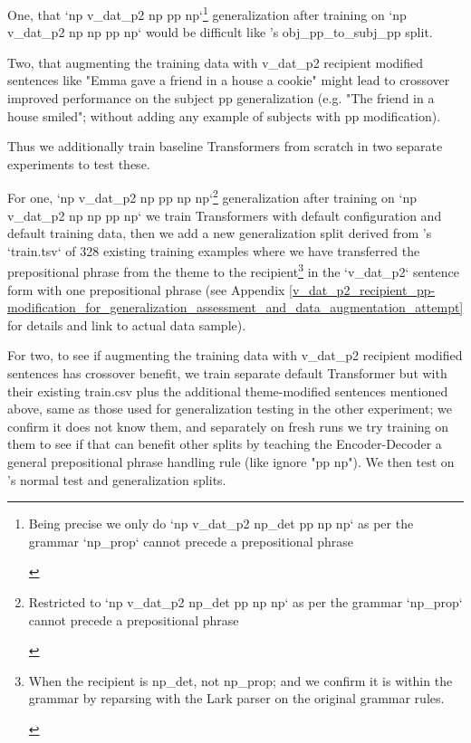 \documentclass[11pt]{article}
\begin{document}
One, that `np v\_dat\_p2 np pp np`\footnote{\begin{footnotesize}Being precise we only do `np v\_dat\_p2 np\_det pp np np` as per the grammar `np\_prop` cannot precede a prepositional phrase\end{footnotesize}} generalization after training on `np v\_dat\_p2 np np pp np` would be difficult like \citep{Wu2023}'s obj\_pp\_to\_subj\_pp split.

Two, that augmenting the training data with v\_dat\_p2 recipient modified sentences like "Emma gave a friend in a house a cookie" might lead to crossover improved performance on the subject pp generalization (e.g. "The friend in a house smiled"; without adding any example of subjects with pp modification).

Thus we additionally train \citep{Wu2023} baseline Transformers from scratch in two separate experiments to test these.

For one, `np v\_dat\_p2 np pp np np`\footnote{\begin{footnotesize}Restricted to `np v\_dat\_p2 np\_det pp np np` as per the grammar `np\_prop` cannot precede a prepositional phrase\end{footnotesize}} generalization after training on `np v\_dat\_p2 np np pp np` we train \citep{Wu2023} Transformers with default configuration and default training data, then we add a new generalization split derived from \citep{Wu2023}'s `train.tsv` of 328 existing training examples where we have transferred the prepositional phrase from the theme to the recipient\footnote{\begin{footnotesize}When the recipient is np\_det, not np\_prop; and we confirm it is within the grammar by reparsing with the Lark parser on the original grammar rules.\end{footnotesize}} in the `v\_dat\_p2` sentence form with one prepositional phrase (see Appendix \ref{v_dat_p2_recipient_pp-modification_for_generalization_assessment_and_data_augmentation_attempt} for details and link to actual data sample).

For two, to see if augmenting the training data with v\_dat\_p2 recipient modified sentences has crossover benefit, we train separate default \citep{Wu2023} Transformer but with their existing train.csv plus the additional theme-modified sentences mentioned above, same as those used for generalization testing in the other experiment; we confirm it does not know them, and separately on fresh runs we try training on them to see if that can benefit other splits by teaching the Encoder-Decoder a general prepositional phrase handling rule (like ignore "pp np"). We then test on \citep{Wu2023}'s normal test and generalization splits.
\end{document}
